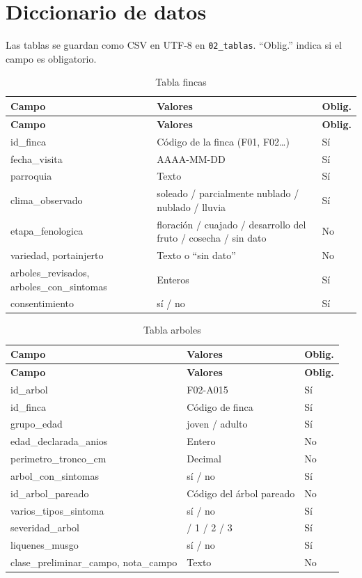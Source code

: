 \documentclass[11pt]{article}
\begin{document}
\section{Diccionario de datos}
Las tablas se guardan como CSV en UTF-8 en \nolinkurl{02_tablas}. “Oblig.” indica si el campo es obligatorio.

{\small
\begin{longtable}{|>{\RaggedRight\arraybackslash}p{4.81cm}|>{\RaggedRight\arraybackslash}p{8.27cm}|>{\RaggedRight\arraybackslash}p{1.54cm}|}
\caption{Tabla fincas}\\
\hline
\rowcolor{encabezado}\textbf{Campo} & \textbf{Valores} & \textbf{Oblig.} \\ \hline
\endfirsthead
\hline
\rowcolor{encabezado}\textbf{Campo} & \textbf{Valores} & \textbf{Oblig.} \\ \hline
\endhead
id\_finca & Código de la finca (F01, F02…) & Sí \\ \hline
fecha\_visita & AAAA-MM-DD & Sí \\ \hline
parroquia & Texto & Sí \\ \hline
clima\_observado & soleado / parcialmente nublado / nublado / lluvia & Sí \\ \hline
etapa\_fenologica & floración / cuajado / desarrollo del fruto / cosecha / sin dato & No \\ \hline
variedad, portainjerto & Texto o “sin dato” & No \\ \hline
arboles\_revisados, arboles\_con\_sintomas & Enteros & Sí \\ \hline
consentimiento & sí / no & Sí \\ \hline
\end{longtable}}
{\small
\begin{longtable}{|>{\RaggedRight\arraybackslash}p{4.81cm}|>{\RaggedRight\arraybackslash}p{8.27cm}|>{\RaggedRight\arraybackslash}p{1.54cm}|}
\caption{Tabla arboles}\\
\hline
\rowcolor{encabezado}\textbf{Campo} & \textbf{Valores} & \textbf{Oblig.} \\ \hline
\endfirsthead
\hline
\rowcolor{encabezado}\textbf{Campo} & \textbf{Valores} & \textbf{Oblig.} \\ \hline
\endhead
id\_arbol & F02-A015 & Sí \\ \hline
id\_finca & Código de finca & Sí \\ \hline
grupo\_edad & joven / adulto & Sí \\ \hline
edad\_declarada\_anios & Entero & No \\ \hline
perimetro\_tronco\_cm & Decimal & No \\ \hline
arbol\_con\_sintomas & sí / no & Sí \\ \hline
id\_arbol\_pareado & Código del árbol pareado & No \\ \hline
varios\_tipos\_sintoma & sí / no & Sí \\ \hline
severidad\_arbol & 0 / 1 / 2 / 3 & Sí \\ \hline
liquenes\_musgo & sí / no & Sí \\ \hline
clase\_preliminar\_campo, nota\_campo & Texto & No \\ \hline
\end{longtable}}
\end{document}
